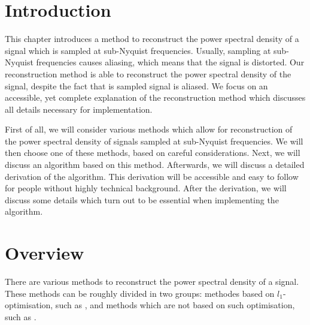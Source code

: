 \documentclass[a4paper, openany, oneside]{memoir}
\begin{document}


\section{Introduction}
This chapter introduces a method to reconstruct the power spectral density of a signal which is sampled at sub-Nyquist frequencies. Usually, sampling at sub-Nyquist frequencies causes aliasing, which means that the signal is distorted. Our reconstruction method is able to reconstruct the power spectral density of the signal, despite the fact that is sampled signal is aliased. We focus on an accessible, yet complete explanation of the reconstruction method which discusses all details necessary for implementation.

First of all, we will consider various methods which allow for reconstruction of the power spectral density of signals sampled at sub-Nyquist frequencies. We will then choose one of these methods, based on careful considerations. Next, we will discuss an algorithm based on this method. Afterwards, we will discuss a detailed derivation of the algorithm. This derivation will be accessible and easy to follow for people without highly technical background. After the derivation, we will discuss some details which turn out to be essential when implementing the algorithm.

\section{Overview}
There are various methods to reconstruct the power spectral density of a signal. These methods can be roughly divided in two groups: methodes based on $l_1$-optimisation, such as \cite{bayarkernel, candes2006robust, candes2007sparsity, candes2008introduction, kirolos2006analog, li2014gomp, polo2009compressive, pal2011coprime}, and methods which are not based on such optimisation, such as \cite{ariananda2011multicoset,ariananda2012compressive}.
\end{document}
